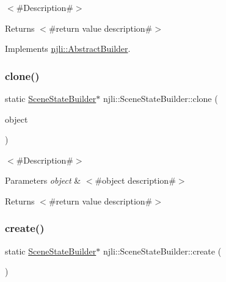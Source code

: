 $<$\#\+Description\#$>$

\begin{DoxyReturn}{Returns}
$<$\#return value description\#$>$ 
\end{DoxyReturn}


Implements \mbox{\hyperlink{classnjli_1_1_abstract_builder_aa1d220053e182c37b31b427499c6eacf}{njli\+::\+Abstract\+Builder}}.

\mbox{\label{classnjli_1_1_scene_state_builder_af4e8a8b91ef4203267d43831379c09c1}} 
\subsubsection{\texorpdfstring{clone()}{clone()}}
{\footnotesize\ttfamily static \mbox{\hyperlink{classnjli_1_1_scene_state_builder}{Scene\+State\+Builder}}$\ast$ njli\+::\+Scene\+State\+Builder\+::clone (\begin{DoxyParamCaption}\item[{const \mbox{\hyperlink{classnjli_1_1_scene_state_builder}{Scene\+State\+Builder}} \&}]{object }\end{DoxyParamCaption})\hspace{0.3cm}{\ttfamily [static]}}

$<$\#\+Description\#$>$


\begin{DoxyParams}{Parameters}
{\em object} & $<$\#object description\#$>$\\
\hline
\end{DoxyParams}
\begin{DoxyReturn}{Returns}
$<$\#return value description\#$>$ 
\end{DoxyReturn}
\mbox{\label{classnjli_1_1_scene_state_builder_ae0807229954ee519c875880eb7a2f69d}} 
\subsubsection{\texorpdfstring{create()}{create()}}
{\footnotesize\ttfamily static \mbox{\hyperlink{classnjli_1_1_scene_state_builder}{Scene\+State\+Builder}}$\ast$ njli\+::\+Scene\+State\+Builder\+::create (\begin{DoxyParamCaption}{ }\end{DoxyParamCaption})\hspace{0.3cm}{\ttfamily [static]}}

